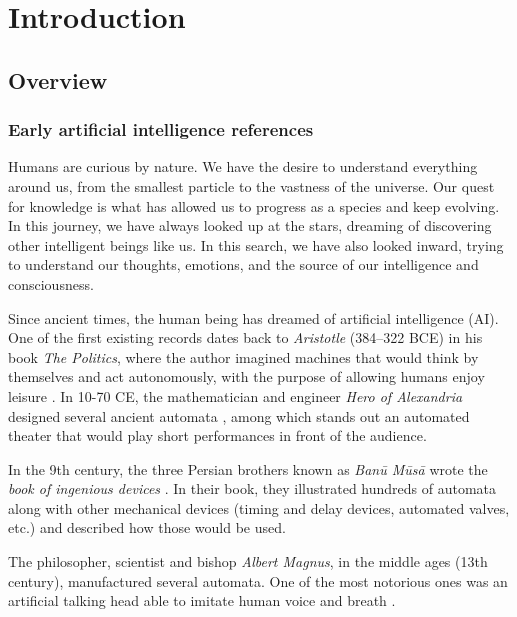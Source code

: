
\chapter{Introduction} \label{ch:introduction}

\section{Overview}

\subsection{Early artificial intelligence references}
Humans are curious by nature. We have the desire to understand everything around us, from the smallest particle to the vastness of the universe. Our quest for knowledge is what has allowed us to progress as a species and keep evolving. In this journey, we have always looked up at the stars, dreaming of discovering other intelligent beings like us. In this search, we have also looked inward, trying to understand our thoughts, emotions, and the source of our intelligence and consciousness. 

Since ancient times, the human being has dreamed of artificial intelligence (AI). One of the first existing records dates back to \textit{Aristotle} (384–322 BCE) in his book \textit{The Politics}, where the author imagined machines that would think by themselves and act autonomously, with the purpose of allowing humans enjoy leisure \autocite{nils2009}. In 10-70 CE, the mathematician and engineer \textit{Hero of Alexandria} designed several ancient automata \autocite{greenwood1851}, among which stands out an automated theater that would play short performances in front of the audience.

In the 9th century, the three Persian brothers known as \textit{Banū Mūsā} wrote the \textit{book of ingenious devices} \autocite{musa1978}. In their book, they illustrated hundreds of automata along with other mechanical devices (timing and delay devices, automated valves, etc.) and described how those would be used. 

The philosopher, scientist and bishop \textit{Albert Magnus}, in the middle ages (13th century), manufactured several automata. One of the most notorious ones was an artificial talking head able to imitate human voice and breath \autocite{worthies1828}.

